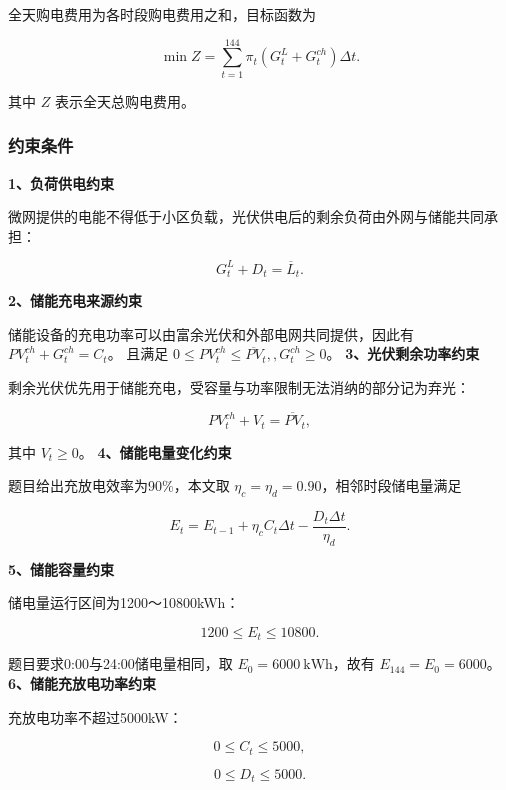 全天购电费用为各时段购电费用之和，目标函数为

\begin{equation}
\min Z=
\sum_{t=1}^{144}
\pi_t
\left(G_t^L+G_t^{ch}\right)\Delta t.
\end{equation}

其中 \(Z\) 表示全天总购电费用。

\subsubsection{约束条件}

\textbf{1、负荷供电约束}

微网提供的电能不得低于小区负载，光伏供电后的剩余负荷由外网与储能共同承担：

\begin{equation}
G_t^L+D_t=\overline L_t.
\end{equation}

\textbf{2、储能充电来源约束}

储能设备的充电功率可以由富余光伏和外部电网共同提供，因此有 \(PV_t^{ch}+G_t^{ch}=C_t\)。 且满足 \(0\leq PV_t^{ch}\leq\overline{PV}_t,, G_t^{ch}\geq0\)。 \textbf{3、光伏剩余功率约束}

剩余光伏优先用于储能充电，受容量与功率限制无法消纳的部分记为弃光：

\begin{equation}
PV_t^{ch}+V_t=\overline{PV}_t,
\end{equation}

其中 \(V_t\geq0\)。 \textbf{4、储能电量变化约束}

题目给出充放电效率为90\%，本文取 \(\eta_c=\eta_d=0.90\)，相邻时段储电量满足

\begin{equation}
E_t
=
E_{t-1}
+\eta_cC_t\Delta t
-\frac{D_t\Delta t}{\eta_d}.
\end{equation}

\textbf{5、储能容量约束}

储电量运行区间为1200～10800kWh：

\begin{equation}
1200\leq E_t\leq10800.
\end{equation}

题目要求0:00与24:00储电量相同，取 \(E_0=6000\ \mathrm{kWh}\)，故有 \(E_{144}=E_0=6000\)。 \textbf{6、储能充放电功率约束}

充放电功率不超过5000kW：

\[
0\leq C_t\leq5000,
\]

\begin{equation}
0\leq D_t\leq5000.
\end{equation}

